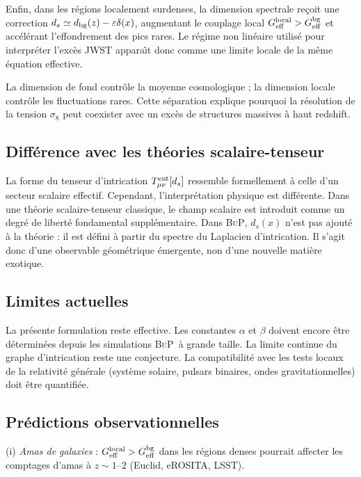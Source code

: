 \documentclass[11pt]{article}
\newcommand{\Geff}{G_{\rm eff}}
\newcommand{\sig}{\sigma_8}
\newcommand{\BuP}{\textsc{BuP}}
\newcommand{\ent}{\rm ent}
\begin{document}
Enfin, dans les r\'egions localement surdenses, la dimension spectrale re\c{c}oit une
correction $d_s\simeq d_{\rm bg}(z)-\varepsilon\delta(x)$, augmentant le couplage
local $\Geff^{\rm local}>\Geff^{\rm bg}$ et acc\'el\'erant l'effondrement des pics
rares. Le r\'egime non lin\'eaire utilis\'e pour interpr\'eter l'exc\`es JWST appara\^{\i}t
donc comme une limite locale de la m\^eme \'equation effective.

La dimension de fond contr\^ole la moyenne cosmologique ; la dimension locale contr\^ole
les fluctuations rares. Cette s\'eparation explique pourquoi la r\'esolution de la
tension $\sig$ peut coexister avec un exc\`es de structures massives \`a haut redshift.

\subsection{Diff\'erence avec les th\'eories scalaire-tenseur}

La forme du tenseur d'intrication $T_{\mu\nu}^{\ent}[d_s]$ ressemble formellement
\`a celle d'un secteur scalaire effectif. Cependant, l'interpr\'etation physique est
diff\'erente. Dans une th\'eorie scalaire-tenseur classique, le champ scalaire est
introduit comme un degr\'e de libert\'e fondamental suppl\'ementaire. Dans \BuP,
$d_s(x)$ n'est pas ajout\'e \`a la th\'eorie : il est d\'efini \`a partir du spectre
du Laplacien d'intrication. Il s'agit donc d'une observable g\'eom\'etrique \'emergente,
non d'une nouvelle mati\`ere exotique.

\subsection{Limites actuelles}

La pr\'esente formulation reste effective. Les constantes $\alpha$ et $\beta$ doivent
encore \^etre d\'etermin\'ees depuis les simulations \BuP\ \`a grande taille. La limite
continue du graphe d'intrication reste une conjecture. La compatibilit\'e avec les
tests locaux de la relativit\'e g\'en\'erale (syst\`eme solaire, pulsars binaires,
ondes gravitationnelles) doit \^etre quantifi\'ee.

\subsection{Pr\'edictions observationnelles}

(i) \textit{Amas de galaxies} : $\Geff^{\rm local}>\Geff^{\rm bg}$ dans les r\'egions
denses pourrait affecter les comptages d'amas \`a $z\sim1$--$2$ (Euclid, eROSITA, LSST).
\end{document}
